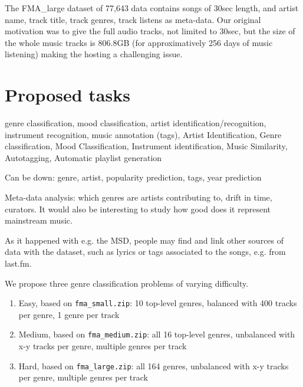 \documentclass{article}
\begin{document}
\noindent
The FMA\_large dataset of 77,643 data contains songs of 30sec length, and artist name, track title, track genres, track listens as meta-data. Our original motivation was to give the full audio tracks, not limited to 30sec, but the size of the whole music tracks is 806.8GB (for approximatively 256 days of music listening) making the hosting a challenging issue.


\section{Proposed tasks} %


genre classification, mood classification, artist identification/recognition, instrument recognition, music annotation (tags),
Artist Identification, Genre classification, Mood Classification, Instrument identification, Music Similarity, Autotagging, Automatic playlist generation

Can be down: genre, artist, popularity prediction, tags, year prediction


Meta-data analysis: which genres are artists contributing to, drift in time, curators.
It would also be interesting to study how good does it represent mainstream music.

As it happened with e.g. the MSD, people may find and link other sources of data with the dataset, such as lyrics or tags associated to the songs, e.g. from last.fm.

We propose three genre classification problems of varying difficulty.

\begin{enumerate}
	\item Easy, based on \texttt{fma\_small.zip}: 10 top-level genres, balanced with 400 tracks per genre, 1 genre per track
	\item Medium, based on \texttt{fma\_medium.zip}: all 16 top-level genres, unbalanced with x-y tracks per genre, multiple genres per track
	\item Hard, based on \texttt{fma\_large.zip}: all 164 genres, unbalanced with x-y tracks per genre, multiple genres per track
\end{enumerate}
\end{document}
